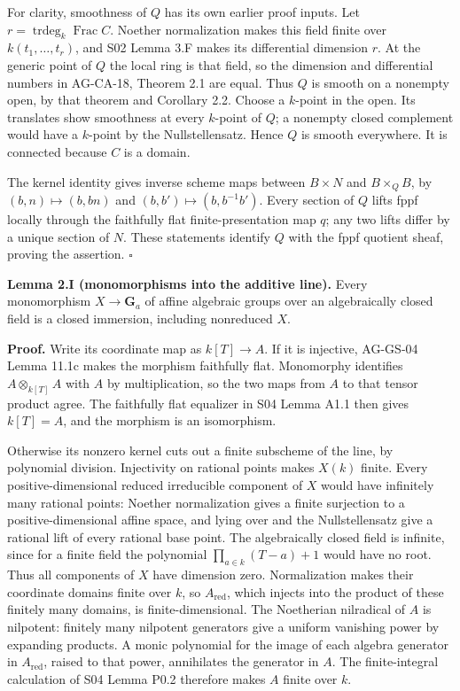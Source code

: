 \documentclass[11pt,a4paper,openany]{report}
\newcounter{none}
\begin{document}
For clarity, smoothness of \(Q\) has its own earlier proof inputs. Let \(r=\operatorname{trdeg}_k\operatorname{Frac}C\). Noether normalization makes this field finite over \(k(t_1,\ldots,t_r)\), and S02 Lemma 3.F makes its differential dimension \(r\). At the generic point of \(Q\) the local ring is that field, so the dimension and differential numbers in AG-CA-18, Theorem 2.1 are equal. Thus \(Q\) is smooth on a nonempty open, by that theorem and Corollary 2.2. Choose a \(k\)-point in the open. Its translates show smoothness at every \(k\)-point of \(Q\); a nonempty closed complement would have a \(k\)-point by the Nullstellensatz. Hence \(Q\) is smooth everywhere. It is connected because \(C\) is a domain.

The kernel identity gives inverse scheme maps between \(B\times N\) and \(B\times_QB\), by \((b,n)\mapsto(b,bn)\) and \((b,b')\mapsto(b,b^{-1}b')\). Every section of \(Q\) lifts fppf locally through the faithfully flat finite-presentation map \(q\); any two lifts differ by a unique section of \(N\). These statements identify \(Q\) with the fppf quotient sheaf, proving the assertion. \(\square\)

\textbf{Lemma 2.I (monomorphisms into the additive line).} Every monomorphism \(X\to\mathbf G_a\) of affine algebraic groups over an algebraically closed field is a closed immersion, including nonreduced \(X\).

\textbf{Proof.} Write its coordinate map as \(k[T]\to A\). If it is injective, AG-GS-04 Lemma 11.1c makes the morphism faithfully flat. Monomorphy identifies \(A\otimes_{k[T]}A\) with \(A\) by multiplication, so the two maps from \(A\) to that tensor product agree. The faithfully flat equalizer in S04 Lemma A1.1 then gives \(k[T]=A\), and the morphism is an isomorphism.

Otherwise its nonzero kernel cuts out a finite subscheme of the line, by polynomial division. Injectivity on rational points makes \(X(k)\) finite. Every positive-dimensional reduced irreducible component of \(X\) would have infinitely many rational points: Noether normalization gives a finite surjection to a positive-dimensional affine space, and lying over and the Nullstellensatz give a rational lift of every rational base point. The algebraically closed field is infinite, since for a finite field the polynomial \(\prod_{a\in k}(T-a)+1\) would have no root. Thus all components of \(X\) have dimension zero. Normalization makes their coordinate domains finite over \(k\), so \(A_{\mathrm{red}}\), which injects into the product of these finitely many domains, is finite-dimensional. The Noetherian nilradical of \(A\) is nilpotent: finitely many nilpotent generators give a uniform vanishing power by expanding products. A monic polynomial for the image of each algebra generator in \(A_{\mathrm{red}}\), raised to that power, annihilates the generator in \(A\). The finite-integral calculation of S04 Lemma P0.2 therefore makes \(A\) finite over \(k\).
\end{document}
